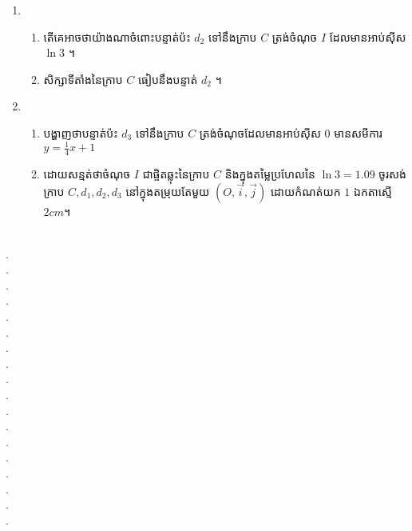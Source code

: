\documentclass{officialexam}
\begin{document}
\begin{enumerate}[I]
\begin{enumerate}[1]
\begin{enumerate}[k]
			\end{enumerate}
			\item \begin{enumerate}[k]
				\item តើគេអាចថាយ៉ាងណាចំពោះបន្ទាត់ប៉ះ $d_2$ ទៅនឹងក្រាប $C$ ត្រង់ចំណុច $I$ ដែលមានអាប់ស៊ីស $\ln3$ ។
				\item សិក្សាទីតាំងនៃក្រាប $C$ ធៀបនឹងបន្ទាត់ $d_2$ ។
			\end{enumerate}
			\item \begin{enumerate}[k]
				\item បង្ហាញថាបន្ទាត់ប៉ះ $d_3$ ទៅនឹងក្រាប $C$ ត្រង់ចំណុចដែលមានអាប់ស៊ីស $0$ មានសមីការ $y=\frac{1}{4}x+1$
				\item ដោយសន្មត់ថាចំណុច $I$ ជាផ្ចិតឆ្លុះនៃក្រាប $C$ និងក្នុងតម្លៃប្រហែលនៃ $\ln3=1.09$ ចូរសង់ក្រាប $C, d_1, d_2, d_3$ នៅក្នុងតម្រុយតែមួយ $\left(O,\vec{i}, \vec{j}\right)$ ដោយកំណត់យក $1$ ឯកតាស្មើ $2cm$។
			\end{enumerate}
		\end{enumerate}
	\end{enumerate}
	\\
	{\color{white}.}\dotfill\\
	{\color{white}.}\dotfill\\
	{\color{white}.}\dotfill
	\\
	{\color{white}.}\dotfill\\
	{\color{white}.}\dotfill\\
	{\color{white}.}\dotfill
	\\
	{\color{white}.}\dotfill\\
	{\color{white}.}\dotfill\\
	{\color{white}.}\dotfill
	\\
	{\color{white}.}\dotfill\\
	{\color{white}.}\dotfill\\
	{\color{white}.}\dotfill
	\\
	{\color{white}.}\dotfill\\
	{\color{white}.}\dotfill\\
	{\color{white}.}\dotfill
	\\
	{\color{white}.}\dotfill\\
	{\color{white}.}\dotfill\\
	{\color{white}.}\dotfill
	\newpage
	{\maketitle}
	\begin{center}
	\end{center}
\end{document}
